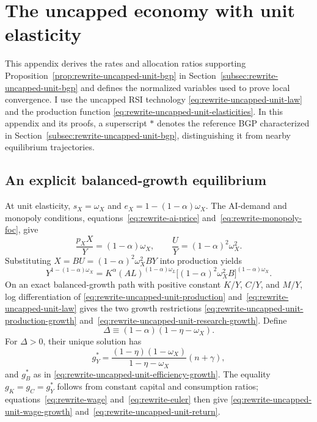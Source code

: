 \section{The uncapped economy with unit elasticity}
\label{app:rewrite-uncapped-unit}

This appendix derives the rates and allocation ratios supporting
Proposition~\ref{prop:rewrite-uncapped-unit-bgp} in
Section~\ref{subsec:rewrite-uncapped-unit-bgp} and defines the normalized
variables used to prove local convergence. I use the uncapped RSI technology
\eqref{eq:rewrite-uncapped-unit-law} and the production function
\eqref{eq:rewrite-uncapped-unit-elasticities}.
In this appendix and its proofs, a superscript $*$ denotes the reference
BGP characterized in Section~\ref{subsec:rewrite-uncapped-unit-bgp},
distinguishing it from nearby equilibrium trajectories.

\subsection{An explicit balanced-growth equilibrium}

At unit elasticity, $s_X=\omega_X$ and $e_X=1-(1-\alpha)\omega_X$. The AI-demand and monopoly conditions,
equations~\eqref{eq:rewrite-ai-price} and~\eqref{eq:rewrite-monopoly-foc}, give
\begin{equation}
 \frac{p_XX}{Y}=(1-\alpha)\omega_X,\qquad
 \frac UY=(1-\alpha)^2\omega_X^2.
 \label{eq:rewrite-uncapped-unit-static-shares}
\end{equation}
Substituting $X=BU=(1-\alpha)^2\omega_X^2BY$ into production yields
\begin{equation}
 Y^{1-(1-\alpha)\omega_X}
 =K^\alpha(AL)^{(1-\alpha)\omega_L}
 \bigl[(1-\alpha)^2\omega_X^2B\bigr]^{(1-\alpha)\omega_X}.
 \label{eq:rewrite-uncapped-unit-production}
\end{equation}
On an exact balanced-growth path with positive constant $K/Y$, $C/Y$, and $M/Y$,
log differentiation of \eqref{eq:rewrite-uncapped-unit-production}
and~\eqref{eq:rewrite-uncapped-unit-law} gives the two growth restrictions
\eqref{eq:rewrite-uncapped-unit-production-growth}
and~\eqref{eq:rewrite-uncapped-unit-research-growth}.
Define
\begin{equation}
 \Delta\equiv(1-\alpha)(1-\eta-\omega_X).
 \label{eq:rewrite-uncapped-unit-feedback}
\end{equation}
For $\Delta>0$, their unique solution has
\begin{equation}
 g_Y^*=\frac{(1-\eta)(1-\omega_X)}{1-\eta-\omega_X}(n+\gamma),
 \label{eq:rewrite-uncapped-unit-output-growth}
\end{equation}
and $g_B^*$ as in \eqref{eq:rewrite-uncapped-unit-efficiency-growth}.
The equality $g_K=g_C=g_Y^*$ follows from constant capital and consumption ratios;
equations~\eqref{eq:rewrite-wage} and~\eqref{eq:rewrite-euler} then give
\eqref{eq:rewrite-uncapped-unit-wage-growth}
and~\eqref{eq:rewrite-uncapped-unit-return}.

